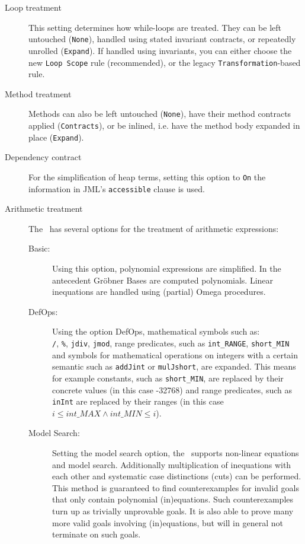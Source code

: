 \begin{description}
\begin{description}
\begin{description}
    \item[Loop treatment] This setting determines how while-loops are
      treated. They can be left untouched (\texttt{None}), handled
      using stated invariant contracts, or
      repeatedly unrolled (\texttt{Expand}). If handled using invariants,
      you can either choose the new \texttt{Loop Scope} rule (recommended),
      or the legacy \texttt{Transformation}-based rule.

    
    \item[Method treatment] Methods can also be left untouched
      (\texttt{None}), have their method contracts applied
      (\texttt{Contracts}), or be inlined, i.e. have the method body
      expanded in place (\texttt{Expand}).
      
    \item[Dependency contract] For the simplification of heap terms, setting this option to \texttt{On}
				the information in JML's \texttt{accessible} clause is used. 

   \item[Arithmetic treatment] The \kp\ has several options for the treatment of arithmetic expressions:
   \begin{description}
   \item[Basic:] Using this option, polynomial expressions are simplified. 
		 In the antecedent Gr\"{o}bner Bases are computed polynomials.
		 Linear inequations are handled using (partial) Omega procedures.

   \item[DefOps:] Using the option \textsf{DefOps}, mathematical symbols such as:\\
                \texttt{/}, \texttt{\%}, \texttt{jdiv}, \texttt{jmod}, range predicates, such as
                \texttt{int\_RANGE}, \texttt{short\_MIN} and symbols for mathematical operations on 
                integers with a certain semantic such as
                \texttt{addJint} or \texttt{mulJshort}, are expanded. This means for example constants, 
                such as \texttt{short\_MIN}, are  
		 replaced by their concrete values (in this case -32768) and range predicates, 
		 such as \texttt{inInt} are replaced by their ranges 
		 (in this case $i \leq int\_MAX \wedge int\_MIN \leq i$).
		 
                
    \item[Model Search:] Setting the \textsf{model search} option, 
		  the \kp\ supports non-linear equations and model search.
		  Additionally multiplication of inequations with each other
		  and systematic case distinctions  (cuts) can be performed.
                This method is guaranteed to find counterexamples for
                invalid goals that only contain polynomial (in)equations.
                Such counterexamples turn up as trivially unprovable goals.
                It is also able to prove many more valid goals involving
                (in)equations, but will in general not terminate on such goals.
                

\end{description}
\end{description}
\end{description}
\end{description}
